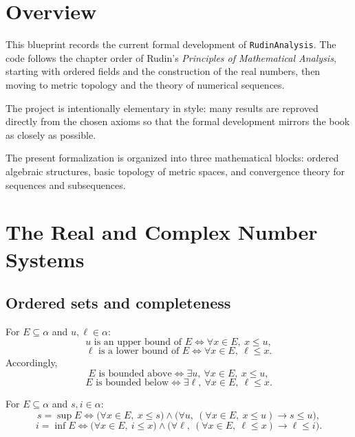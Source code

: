 \chapter{Overview}

This blueprint records the current formal development of \texttt{RudinAnalysis}.
The code follows the chapter order of Rudin's \emph{Principles of Mathematical Analysis},
starting with ordered fields and the construction of the real numbers, then moving to
metric topology and the theory of numerical sequences.

The project is intentionally elementary in style: many results are reproved directly from
the chosen axioms so that the formal development mirrors the book as closely as possible.

\begin{definition}
\label{def:project-scope}
The present formalization is organized into three mathematical blocks:
ordered algebraic structures, basic topology of metric spaces, and convergence theory for
sequences and subsequences.
\end{definition}

\chapter{The Real and Complex Number Systems}

\section{Ordered sets and completeness}

\begin{definition}
\label{def:ordered-bounds}
For $E \subseteq \alpha$ and $u,\ell \in \alpha$:
\[
u \text{ is an upper bound of } E \iff \forall x \in E,\ x \le u,
\]
\[
\ell \text{ is a lower bound of } E \iff \forall x \in E,\ \ell \le x.
\]
Accordingly,
\[
E \text{ is bounded above} \iff \exists u,\ \forall x \in E,\ x \le u,
\]
\[
E \text{ is bounded below} \iff \exists \ell,\ \forall x \in E,\ \ell \le x.
\]
\end{definition}

\begin{definition}
\label{def:sup-inf}
For $E \subseteq \alpha$ and $s,i \in \alpha$:
\[
s = \sup E \iff
\bigl(\forall x \in E,\ x \le s\bigr) \land
\bigl(\forall u,\ (\forall x \in E,\ x \le u) \to s \le u\bigr),
\]
\[
i = \inf E \iff
\bigl(\forall x \in E,\ i \le x\bigr) \land
\bigl(\forall \ell,\ (\forall x \in E,\ \ell \le x) \to \ell \le i\bigr).
\]
\end{definition}

